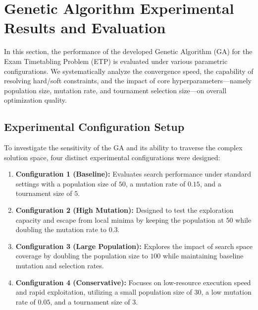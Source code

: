 
\section{Genetic Algorithm Experimental Results and Evaluation}
\label{sec:ga_experimental_results}

In this section, the performance of the developed Genetic Algorithm (GA) for the Exam Timetabling Problem (ETP) is evaluated under various parametric configurations. We systematically analyze the convergence speed, the capability of resolving hard/soft constraints, and the impact of core hyperparameters---namely population size, mutation rate, and tournament selection size---on overall optimization quality.

\subsection{Experimental Configuration Setup}
\label{subsec:experimental_configurations}

To investigate the sensitivity of the GA and its ability to traverse the complex solution space, four distinct experimental configurations were designed:
\begin{enumerate}
    \item \textbf{Configuration 1 (Baseline):} Evaluates search performance under standard settings with a population size of $50$, a mutation rate of $0.15$, and a tournament size of $5$.
    \item \textbf{Configuration 2 (High Mutation):} Designed to test the exploration capacity and escape from local minima by keeping the population at $50$ while doubling the mutation rate to $0.3$.
    \item \textbf{Configuration 3 (Large Population):} Explores the impact of search space coverage by doubling the population size to $100$ while maintaining baseline mutation and selection rates.
    \item \textbf{Configuration 4 (Conservative):} Focuses on low-resource execution speed and rapid exploitation, utilizing a small population size of $30$, a low mutation rate of $0.05$, and a tournament size of $3$.
\end{enumerate}

